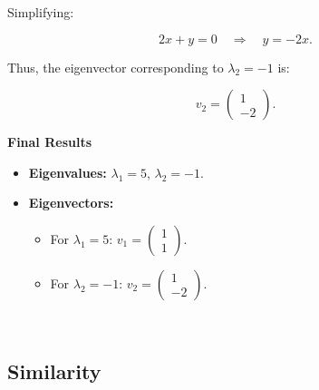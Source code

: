 \documentclass[a4paper,12pt]{article}
\begin{document}
\begin{frame}
Simplifying:

\[
2x + y = 0 \quad \Rightarrow \quad y = -2x.
\]

Thus, the eigenvector corresponding to \( \lambda_2 = -1 \) is:

\[
v_2 = \begin{pmatrix} 1 \\ -2 \end{pmatrix}.
\]

\textbf{Final Results}
\begin{itemize}
    \item \textbf{Eigenvalues:} \( \lambda_1 = 5 \), \( \lambda_2 = -1 \).
    \item \textbf{Eigenvectors:}
    \begin{itemize}
        \item For \( \lambda_1 = 5 \): \( v_1 = \begin{pmatrix} 1 \\ 1 \end{pmatrix} \).
        \item For \( \lambda_2 = -1 \): \( v_2 = \begin{pmatrix} 1 \\ -2 \end{pmatrix} \).
    \end{itemize}
\end{itemize}
\
\end{frame}


\Large \subsection{Similarity}\label{sec:Similarity}
\small

\small
\end{document}
